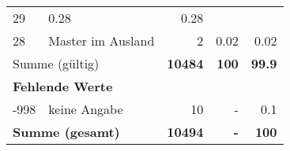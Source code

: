 \begin{longtable}{lXrrr}
       \num{29} &
       \num[round-mode=places,round-precision=2]{0,28} &
         \num[round-mode=places,round-precision=2]{0,28} \\

     28 &
     \multicolumn{1}{X}{ Master im Ausland   } &


       \num{2} &
       \num[round-mode=places,round-precision=2]{0,02} &
         \num[round-mode=places,round-precision=2]{0,02} \\
     \midrule
     \multicolumn{2}{l}{Summe (gültig)} &
       \textbf{\num{10484}} &
     \textbf{100} &
       \textbf{\num[round-mode=places,round-precision=2]{99,9}} \\
     \multicolumn{5}{l}{\textbf{Fehlende Werte}}\\
       -998 &
       keine Angabe &
         \num{10} &
        - &
         \num[round-mode=places,round-precision=2]{0,1} \\
     \midrule
     \multicolumn{2}{l}{\textbf{Summe (gesamt)}} &
          \textbf{\num{10494}} &
        \textbf{-} &
        \textbf{100} \\
     \bottomrule
     \end{longtable}
     
